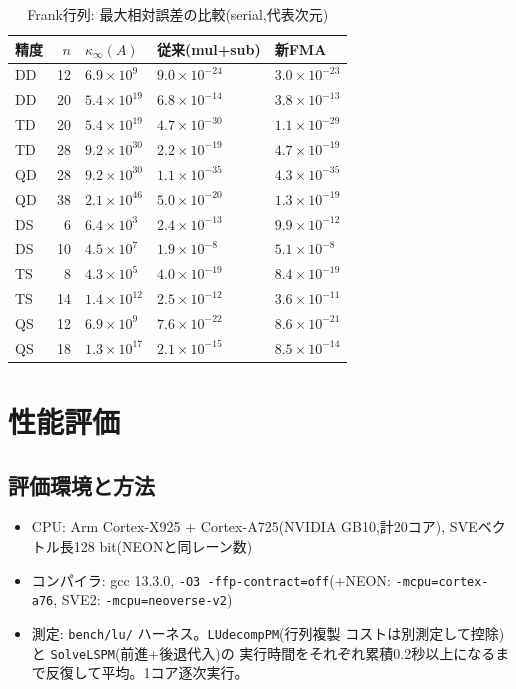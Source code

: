 \documentclass[a4j,dvipdfmx,11pt]{jsarticle}
\begin{document}
\begin{table}[htbp]
\centering
\caption{Frank行列: 最大相対誤差の比較(serial,代表次元)}
\label{tab:illfrank}
\small
\begin{tabular}{lrlll}
\toprule
精度 & $n$ & $\kappa_\infty(A)$ & 従来(mul+sub) & 新FMA \\
\midrule
DD & 12 & $6.9\times10^{9}$ & $9.0\times10^{-24}$ & $3.0\times10^{-23}$ \\
DD & 20 & $5.4\times10^{19}$ & $6.8\times10^{-14}$ & $3.8\times10^{-13}$ \\
TD & 20 & $5.4\times10^{19}$ & $4.7\times10^{-30}$ & $1.1\times10^{-29}$ \\
TD & 28 & $9.2\times10^{30}$ & $2.2\times10^{-19}$ & $4.7\times10^{-19}$ \\
QD & 28 & $9.2\times10^{30}$ & $1.1\times10^{-35}$ & $4.3\times10^{-35}$ \\
QD & 38 & $2.1\times10^{46}$ & $5.0\times10^{-20}$ & $1.3\times10^{-19}$ \\
DS & 6 & $6.4\times10^{3}$ & $2.4\times10^{-13}$ & $9.9\times10^{-12}$ \\
DS & 10 & $4.5\times10^{7}$ & $1.9\times10^{-8}$ & $5.1\times10^{-8}$ \\
TS & 8 & $4.3\times10^{5}$ & $4.0\times10^{-19}$ & $8.4\times10^{-19}$ \\
TS & 14 & $1.4\times10^{12}$ & $2.5\times10^{-12}$ & $3.6\times10^{-11}$ \\
QS & 12 & $6.9\times10^{9}$ & $7.6\times10^{-22}$ & $8.6\times10^{-21}$ \\
QS & 18 & $1.3\times10^{17}$ & $2.1\times10^{-15}$ & $8.5\times10^{-14}$ \\
\bottomrule
\end{tabular}
\end{table}

\section{性能評価}

\subsection{評価環境と方法}

\begin{itemize}
  \item CPU: Arm Cortex-X925 + Cortex-A725(NVIDIA GB10,計20コア),
        SVEベクトル長128 bit(NEONと同レーン数)
  \item コンパイラ: gcc 13.3.0,
        \texttt{-O3 -ffp-contract=off}(+NEON: \texttt{-mcpu=cortex-a76},
        SVE2: \texttt{-mcpu=neoverse-v2})
  \item 測定: \texttt{bench/lu/} ハーネス。\texttt{LUdecompPM}(行列複製
        コストは別測定して控除)と \texttt{SolveLSPM}(前進+後退代入)の
        実行時間をそれぞれ累積0.2秒以上になるまで反復して平均。1コア逐次実行。
\end{itemize}
\end{document}
